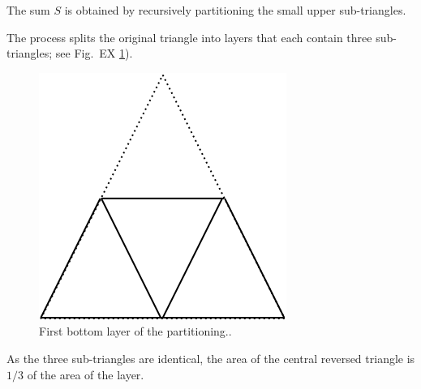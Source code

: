 \begin{itemize}
\smallskip

The sum $S$ is obtained by recursively partitioning the small upper sub-triangles. 

The process splits the original triangle into layers that each contain three sub-triangles; see
Fig.~EX \ref{Fig:Sum1over4FirstLayer}). 
\begin{figure}
\begin{center}
        \includegraphics[scale=0.3]{FiguresMaths/Sum1over4FirstLayer}
        \caption{First bottom layer of the partitioning..}
        \label{Fig:Sum1over4FirstLayer}
\end{center}
\end{figure}
As the three sub-triangles are identical, the area of the central reversed triangle is $1/3$ of the area of the layer. 

\smallskip


\end{itemize}
